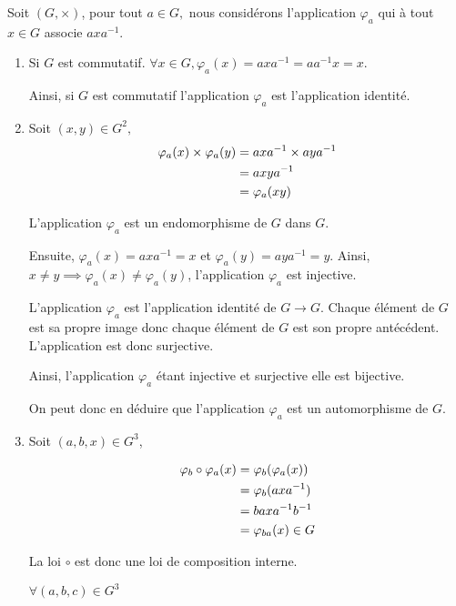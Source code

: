 \documentclass[a4paper,10pt]{article}
\begin{document}
Soit $(G,\times)$, pour tout $a \in G,$ nous considérons l'application $\varphi_a$  qui à tout $x \in G$ associe $axa^{-1}$.
\begin{enumerate}

\item
	Si $G$ est commutatif.
	$\forall x \in G, \varphi_a(x)=axa^{-1}=aa^{-1}x=x$.
	
	Ainsi, si $G$ est commutatif l'application $\varphi_a$ est l'application identité.
	
\bigskip

\item
Soit $(x,y) \in G^2,$
\begin{align}
	\varphi_a(x) \times \varphi_a(y) &= axa^{-1} \times aya^{-1}\notag \\
	&= axya^{-1} \notag \\
	&= \varphi_a(xy) \notag
\end{align}

L'application $\varphi_a$ est un endomorphisme de $G$ dans $G$.
\medskip

Ensuite, $\varphi_a(x)=axa^{-1}=x  $ et $\varphi_a(y)=aya^{-1} =y$.
Ainsi,$ x \neq y \implies \varphi_a(x) \neq \varphi_a(y)$, l'application $\varphi_a$ est injective.
\medskip

L'application $ \varphi_a $ est l'application identité de $G\longrightarrow G$. Chaque élément de $G$ est sa propre image donc chaque élément de $G$ est son propre antécédent. L'application est donc surjective.
\medskip

Ainsi, l'application $ \varphi_a $ étant injective et surjective elle est bijective.

On peut donc en déduire que l'application $ \varphi_a $ est un automorphisme de $G$.

\bigskip

\item
Soit  $ (a,b,x) \in G^3$,

\begin{align}
	\varphi_b \circ\varphi_a(x) &= \varphi_b(\varphi_a(x))\notag \\
	&=\varphi_b(axa^{-1}) \notag \\
	&=baxa^{-1}b^{-1} \notag \\
	&=\varphi_{ba}(x)  \in G\notag
\end{align}

La loi $\circ$ est donc une loi de composition interne.
\medskip


$\forall (a,b,c) \in G^3 $


\end{enumerate}
\end{document}
